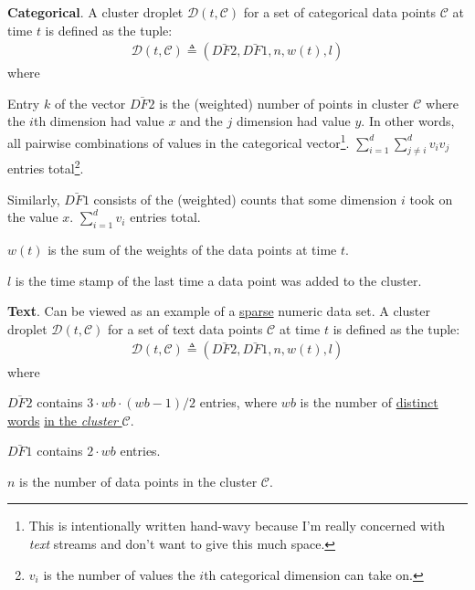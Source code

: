 \documentclass[11pt]{article}
\begin{document}
\begin{compactitem}
	\item \textbf{Categorical}. A cluster droplet $\mathcal{D}(t, \mathcal{C})$ for a set of
	categorical data points $\mathcal{C}$ at time $t$ is defined as the tuple:
	\begin{align}
		\mathcal{D}(t, \mathcal{C}) \triangleq (\bar{DF2},  \bar{DF1}, n, w(t), l)
	\end{align}
	where
	\begin{compactitem}
		\item Entry $k$ of the vector $\bar{DF2}$ is the (weighted) number of points in cluster $\mathcal{C}$ where the $i$th dimension had value $x$ and the $j$ dimension had value $y$. In other words, all pairwise combinations of values in the categorical vector\footnote{This is intentionally written hand-wavy because I'm really concerned with \textit{text} streams and don't want to give this much space.}. $\sum_{i = 1}^{d} \sum_{j \ne i}^{d} v_i v_j$ entries total\footnote{$v_i$ is the number of values the $i$th categorical dimension can take on.}.
		
		\item Similarly, $\bar{DF1}$ consists of the (weighted) counts that some dimension $i$ took on the value $x$. $\sum_{i = 1}^{d}v_i $ entries total.
		
		\item $w(t)$ is the sum of the weights of the data points at time $t$. 
		
		\item $l$ is the time stamp of the last time a data point was added to the cluster.
	\end{compactitem}
	
	
	\item \textbf{Text}. Can be viewed as an example of a \underline{sparse} numeric data set.  A cluster droplet $\mathcal{D}(t, \mathcal{C})$ for a set of text data points $\mathcal{C}$ at time $t$ is defined as the tuple:
	\begin{align}
	\mathcal{D}(t, \mathcal{C}) \triangleq (\bar{DF2},  \bar{DF1}, n, w(t), l)
	\end{align}
	where
	\begin{compactitem}
		\item $\bar{DF2}$ contains $3 \cdot wb \cdot (wb - 1) / 2$ entries, where $wb$ is the number of \underline{distinct words} \underline{in the \textit{cluster} $\mathcal{C}$}.
		
		\item $\bar{DF1}$ contains $2 \cdot wb$ entries.
		
		\item $n$ is the number of data points in the cluster $\mathcal{C}$. 
	\end{compactitem}
\end{compactitem}
\end{document}
